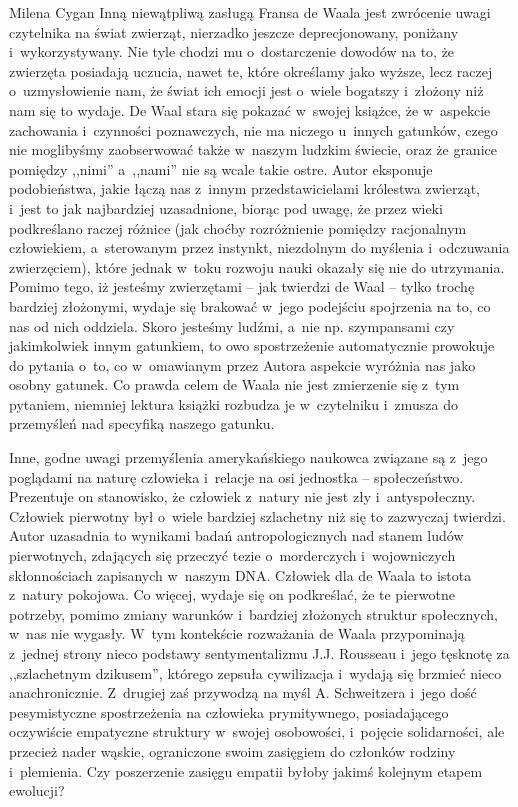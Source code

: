 \begin{recplenv}{Milena Cygan}
Inną niewątpliwą zasługą Fransa de Waala jest zwrócenie uwagi czytelnika na świat zwierząt, nierzadko jeszcze
deprecjonowany, poniżany i~wykorzystywany. Nie tyle chodzi mu o~dostarczenie dowodów na to, że zwierzęta posiadają
uczucia, nawet te, które określamy jako wyższe, lecz raczej o~uzmysłowienie nam, że świat ich emocji jest o~wiele
bogatszy i~złożony niż nam się to wydaje. De Waal stara się pokazać w~swojej książce, że w~aspekcie
zachowania i~czynności poznawczych, nie ma niczego u~innych gatunków, czego nie moglibyśmy zaobserwować także w~naszym ludzkim
świecie, oraz że granice pomiędzy ,,nimi'' a~,,nami'' nie są wcale takie ostre. Autor eksponuje podobieństwa, jakie łączą
nas z~innym przedstawicielami królestwa zwierząt, i~jest to jak najbardziej uzasadnione, biorąc pod uwagę, że przez
wieki podkreślano raczej różnice (jak choćby rozróżnienie pomiędzy racjonalnym człowiekiem, a~sterowanym przez
instynkt, niezdolnym do myślenia i~odczuwania zwierzęciem), które jednak w~toku rozwoju nauki okazały się nie do
utrzymania. Pomimo tego, iż jesteśmy zwierzętami -- jak twierdzi de Waal -- tylko trochę bardziej złożonymi, wydaje się
brakować w~jego podejściu spojrzenia na to, co nas od nich oddziela. Skoro jesteśmy ludźmi, a~nie np. szympansami czy
jakimkolwiek innym gatunkiem, to owo spostrzeżenie automatycznie prowokuje do pytania o~to, co w~omawianym przez Autora
aspekcie wyróżnia nas jako osobny gatunek. Co prawda celem de Waala nie jest zmierzenie się z~tym pytaniem, niemniej
lektura książki rozbudza je w~czytelniku i~zmusza do przemyśleń nad specyfiką naszego gatunku.

\enlargethispage{-.5\baselineskip}

Inne, godne uwagi przemyślenia amerykańskiego naukowca związane są z~jego poglądami na naturę człowieka i~relacje na osi
jednostka -- społeczeństwo. Prezentuje on stanowisko, że człowiek z~natury nie jest zły i~antyspołeczny. Człowiek
pierwotny był o~wiele bardziej szlachetny niż się to zazwyczaj twierdzi. Autor uzasadnia to wynikami badań
antropologicznych nad stanem ludów pierwotnych, zdających się przeczyć tezie o~morderczych i~wojowniczych skłonnościach
zapisanych w~naszym DNA. Człowiek dla de Waala to istota z~natury pokojowa. Co więcej, wydaje się on podkreślać, że te
pierwotne potrzeby, pomimo zmiany warunków i~bardziej złożonych struktur społecznych, w~nas nie wygasły. W~tym kontekście
rozważania de Waala przypominają z~jednej strony nieco podstawy sentymentalizmu J.J. Rousseau i~jego tęsknotę za
,,szlachetnym dzikusem'', którego zepsuła cywilizacja i~wydają się brzmieć nieco anachronicznie. Z~drugiej zaś przywodzą
na myśl A. Schweitzera i~jego dość pesymistyczne spostrzeżenia na człowieka prymitywnego, posiadającego oczywiście
empatyczne struktury w~swojej osobowości, i~pojęcie solidarności, ale przecież nader wąskie, ograniczone swoim
zasięgiem do członków rodziny i~plemienia. Czy poszerzenie zasięgu empatii byłoby jakimś kolejnym etapem ewolucji?


\end{recplenv}
